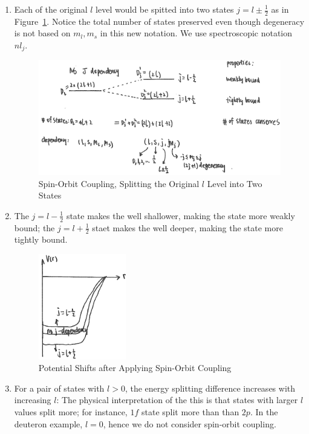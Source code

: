 \documentclass{school-22.101-notes}
\begin{document}
\begin{enumerate}
\item Each of the original $l$ level would be spitted into two states $j= l \pm \frac{1}{2}$ as in Figure~\ref{s-o-coupling}. Notice the total number of states preserved even though degeneracy is not based on $m_l, m_s$ in this new notation. We use spectroscopic notation $nl_j$.  
\begin{figure}[h!]
    \centering
    \includegraphics[width=4.6in]{images/shell/spin-orbit-coupling.png}
    \caption{Spin-Orbit Coupling, Splitting the Original $l$ Level into Two States}
    \label{s-o-coupling}
\end{figure}

\item The $j=l-\frac{1}{2}$ state makes the well shallower, making the state more weakly bound; the $j=l+\frac{1}{2}$ staet makes the well deeper, making the state more tightly bound. 
\begin{figure}[h!]
    \centering
    \includegraphics[width=1.5in]{images/shell/spin-orbit-coupling-potential.png}
    \caption{Potential Shifts after Applying Spin-Orbit Coupling}
\end{figure}

\item For a pair of states with $l>0$, the energy splitting difference increases with increasing $l$:
The physical interpretation of the this is that states with larger $l$ values split more; for instance, $1f$ state split more than than $2p$. In the deuteron example, $l=0$, hence we do not consider spin-orbit coupling. 
\end{enumerate}
\end{document}
